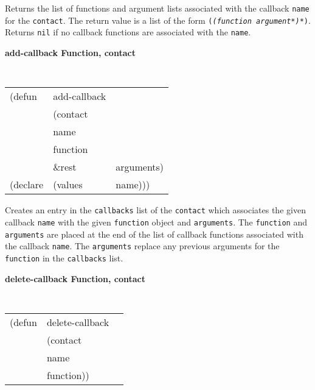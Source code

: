 \documentclass[twoside]{book}
\begin{document}
\begin{sloppy}
{\begin{flushright}
{}\end{flushright}
}

\begin{flushright} 
\parbox[t]{6.125in}{
Returns the list of functions and argument lists associated with the callback
{\tt name} for the {\tt contact}. The return value is a list of the form 
{\tt ({\em (function argument*)*})}.
Returns {\tt nil} if no callback functions are associated with  the {\tt name}.}
\end{flushright}

{\samepage
{\large {\bf add-callback \hfill Function, contact}} 
\begin{flushright} \parbox[t]{6.125in}{
\tt
\begin{tabular}{lll}
\raggedright
(defun & add-callback & \\ 
& (contact\\
& name \\
& function\\
& \&rest & arguments)\\
(declare &(values &name)))
\end{tabular}
\rm

}\end{flushright}}

\begin{flushright} \parbox[t]{6.125in}{
Creates an entry in the {\tt callbacks} list of the {\tt contact} which
associates the given callback {\tt name} with the given {\tt function}
object and {\tt arguments}.
The {\tt function} and {\tt arguments} are placed at the end of the list of
callback functions associated with the callback {\tt name}.
The {\tt arguments} replace any previous arguments for the {\tt function} in the
{\tt callbacks} list.

}\end{flushright}

{\samepage
{\large {\bf delete-callback \hfill Function, contact}}
\begin{flushright} \parbox[t]{6.125in}{
\tt
\begin{tabular}{lll}
\raggedright
(defun & delete-callback & \\ 
& (contact\\
&  name \\
&  function))
\end{tabular}
\rm

}\end{flushright}}


\end{sloppy}
\end{document}
